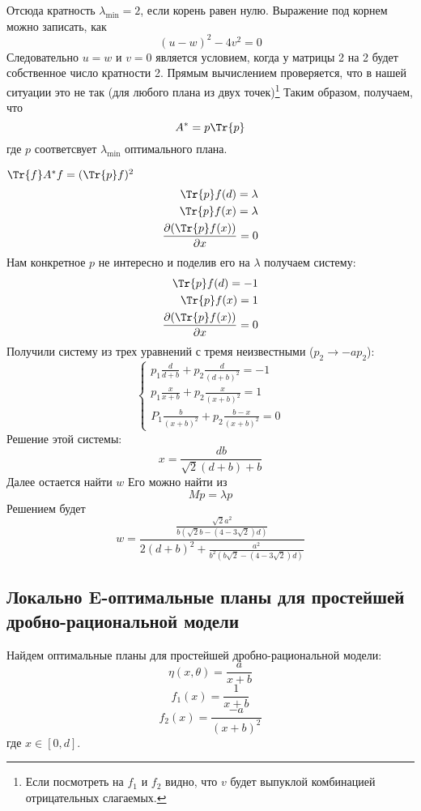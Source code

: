 Отсюда кратность $\lambda_{\min}= 2$, если корень равен нулю. 
Выражение под корнем  можно записать, как 
$$(u- w)^2 - 4v^2  = 0$$ 
Следовательно $u=w$ и $v=0$ является условием, когда у матрицы 2 на 2 будет собственное число кратности 2.
Прямым вычислением проверяется, что в нашей ситуации это не так (для любого плана из двух точек)\footnote{Если посмотреть на $f_1$ и $f_2$ видно, что $v$ будет выпуклой комбинацией отрицательных слагаемых.}
Таким образом, получаем, что
$$A^{*} = p\Tr{p}$$
где $p$ соответсвует $\lambda_{\min}$ оптимального плана.

$\Tr{f}A^{*} f = (\Tr{p}f)^2$
\begin{equation}
\begin{split}
\Tr{p}f(d) = \lambda \\
\Tr{p}f(x)  = \lambda\\
\frac{\partial(\Tr{p}f(x))}{\partial x} = 0
\end{split}
\end{equation}
Нам конкретное $p$ не интересно и поделив его на $\lambda$ получаем систему:
\begin{equation}
\begin{split}
\Tr{p}f(d) = -1\\
\Tr{p}f(x)  = 1\\
\frac{\partial(\Tr{p}f(x))}{\partial x} = 0
\end{split}
\end{equation}
Получили систему из трех уравнений с тремя неизвестными ($p_2 \rightarrow -ap_2$):
\begin{equation}
\begin{cases}
p_1\frac{d}{d+b} + p_2 \frac{d}{(d+b)^2} = -1 \\
p_1 \frac{x}{x+b} + p_2 \frac{x}{(x+b)^2} = 1 \\ 
P_1 \frac{b}{(x+b)^2} + p_2 \frac{b-x}{(x+b)^2} = 0
\end{cases}
\end{equation}
Решение этой системы:
$$x = \frac{db}{\sqrt{2}(d+b) + b} $$
Далее остается найти $w$
Его можно найти из  
$$Mp = \lambda p $$
Решением будет 
$$w = \frac{\frac{\sqrt{2}a^2}{b (\sqrt{2}b - (4-3\sqrt{2})d)}}{2(d+b)^2 + \frac{a^2}{b^2(b\sqrt{2}-(4-3\sqrt{2})d)}}$$

\subsection{Локально E-оптимальные планы для простейшей дробно-рациональной модели}
Найдем оптимальные планы для простейшей дробно-рациональной модели:
$$\eta(x,\theta) = \frac{a}{x+b}$$
$$f_1(x) = \frac{1}{x+b}$$
$$f_2(x) = \frac{-a}{(x+b)^2}$$
где $x \in [0,d]$.

